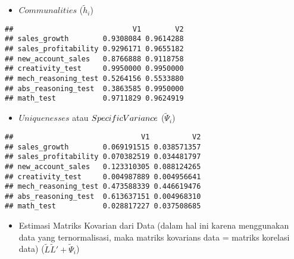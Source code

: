 \documentclass[
]{article}
\newenvironment{Shaded}{\begin{snugshade}}{\end{snugshade}}
\newcommand{\FunctionTok}[1]{\textcolor[rgb]{0.00,0.00,0.00}{#1}}
\newcommand{\NormalTok}[1]{#1}
\newcommand{\SpecialCharTok}[1]{\textcolor[rgb]{0.00,0.00,0.00}{#1}}
\providecommand{\tightlist}{%
  \setlength{\itemsep}{0pt}\setlength{\parskip}{0pt}}
\begin{document}
\begin{itemize}
\tightlist
\item
  \(Communalities\) (\(\tilde{h}_{i}\))
\end{itemize}

\begin{Shaded}
\end{Shaded}

\begin{verbatim}
##                            V1        V2
## sales_growth        0.9308084 0.9614288
## sales_profitability 0.9296171 0.9655182
## new_account_sales   0.8766888 0.9118758
## creativity_test     0.9950000 0.9950000
## mech_reasoning_test 0.5264156 0.5533880
## abs_reasoning_test  0.3863585 0.9950000
## math_test           0.9711829 0.9624919
\end{verbatim}

\begin{itemize}
\tightlist
\item
  \(Uniquenesses\) atau \(Specific \space Variance\)
  (\(\tilde{\Psi}_{i}\))
\end{itemize}

\begin{Shaded}
\end{Shaded}

\begin{verbatim}
##                              V1          V2
## sales_growth        0.069191515 0.038571357
## sales_profitability 0.070382519 0.034481797
## new_account_sales   0.123310305 0.088124265
## creativity_test     0.004987889 0.004956641
## mech_reasoning_test 0.473588339 0.446619476
## abs_reasoning_test  0.613637151 0.004968310
## math_test           0.028817227 0.037508685
\end{verbatim}

\begin{itemize}
\tightlist
\item
  Estimasi Matriks Kovarian dari Data (dalam hal ini karena menggunakan
  data yang ternormalisasi, maka matriks kovarians data = matriks
  korelasi data) (\(\tilde{L}\tilde{L}' + \tilde{\Psi}_{i}\))
\end{itemize}
\end{document}
